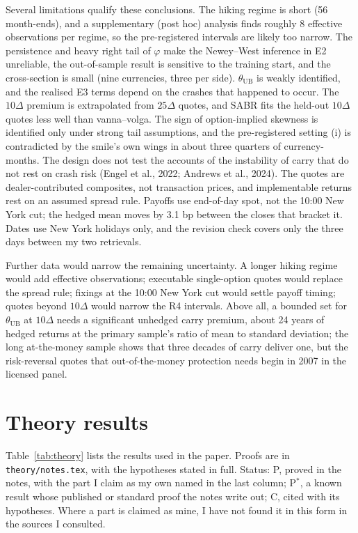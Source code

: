 \documentclass[11pt]{article}
\theoremstyle{result}
\newcommand{\thUB}{\theta_{\mathrm{UB}}}
\newcommand{\D}{\Delta}
\begin{document}
Several limitations qualify these conclusions. The hiking regime is short (56 month-ends), and a supplementary (post hoc) analysis finds roughly 8 effective observations per regime, so the pre-registered intervals are likely too narrow. The persistence and heavy right tail of $\varphi$ make the Newey--West inference in E2 unreliable, the out-of-sample result is sensitive to the training start, and the cross-section is small (nine currencies, three per side). $\thUB$ is weakly identified, and the realised E3 terms depend on the crashes that happened to occur. The $10\D$ premium is extrapolated from $25\D$ quotes, and SABR fits the held-out $10\D$ quotes less well than vanna--volga. The sign of option-implied skewness is identified only under strong tail assumptions, and the pre-registered setting (i) is contradicted by the smile's own wings in about three quarters of currency-months. The design does not test the accounts of the instability of carry that do not rest on crash risk (Engel et al., 2022; Andrews et al., 2024). The quotes are dealer-contributed composites, not transaction prices, and implementable returns rest on an assumed spread rule. Payoffs use end-of-day spot, not the 10:00 New York cut; the hedged mean moves by 3.1 bp between the closes that bracket it. Dates use New York holidays only, and the revision check covers only the three days between my two retrievals.

Further data would narrow the remaining uncertainty. A longer hiking regime would add effective observations; executable single-option quotes would replace the spread rule; fixings at the 10:00 New York cut would settle payoff timing; quotes beyond $10\D$ would narrow the R4 intervals. Above all, a bounded set for $\thUB$ at $10\D$ needs a significant unhedged carry premium, about 24 years of hedged returns at the primary sample's ratio of mean to standard deviation; the long at-the-money sample shows that three decades of carry deliver one, but the risk-reversal quotes that out-of-the-money protection needs begin in 2007 in the licensed panel.

\clearpage
\appendix

\section{Theory results}\label{app:theory}

Table~\ref{tab:theory} lists the results used in the paper. Proofs are in \texttt{theory/notes.tex}, with the hypotheses stated in full. Status: P, proved in the notes, with the part I claim as my own named in the last column; P$^*$, a known result whose published or standard proof the notes write out; C, cited with its hypotheses. Where a part is claimed as mine, I have not found it in this form in the sources I consulted.
\end{document}
